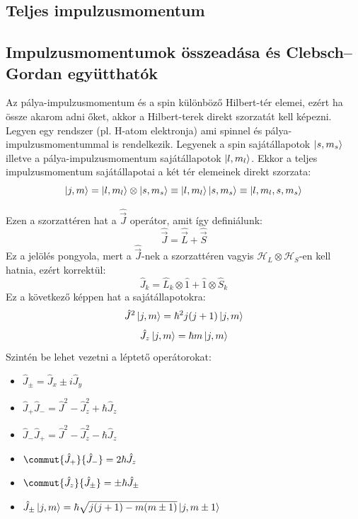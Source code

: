 \subsection{Teljes impulzusmomentum}
\subsection{Impulzusmomentumok összeadása és Clebsch–Gordan együtthatók}
Az pálya-impulzusmomentum és a spin különböző Hilbert-tér elemei, ezért ha össze akarom adni őket,
akkor a Hilbert-terek direkt szorzatát kell képezni.
Legyen egy rendszer (pl. H-atom elektronja) ami spinnel és pálya-impulzusmomentummal is rendelkezik.
Legyenek a spin sajátállapotok $\ket{s, m_s}$ illetve a pálya-impulzusmomentum sajátállapotok $\ket{l, m_l}$.
Ekkor a teljes impulzusmomentum sajátállapotai a két tér elemeinek direkt szorzata:
\begin{equation}
    \ket{j, m} = \ket{l, m_l} \otimes \ket{s, m_s} \equiv \ket{l, m_l}\ket{s, m_s} \equiv \ket{l, m_l,s, m_s}
\end{equation} 

Ezen a szorzattéren hat a $\hat{\vec J}$ operátor, amit így definiálunk:
\begin{equation}
    \hat{\vec J} = \hat{\vec L} + \hat{\vec S}
\end{equation}
Ez a jelölés pongyola, mert a $\hat{\vec J}$-nek a szorzattéren vagyis $\mathcal{H}_L \otimes \mathcal{H}_S$-en kell hatnia,
ezért korrektül:
\begin{equation}
    \hat J_k = \hat L_k \otimes \hat 1 + \hat 1 \otimes \hat S_k
\end{equation}
Ez a következő képpen hat a sajátállapotokra:
\begin{equation}
    \hat J^2 \ket{j, m} = \hbar^2 j(j+1)\ket{j,m}
\end{equation}
\begin{equation}
    \hat J_z \ket{j, m} = \hbar m\ket{j,m}
\end{equation}
Szintén be lehet vezetni a léptető operátorokat:
\begin{itemize}
    \item $
        \hat J_{\pm} = \hat J_x \pm  i \hat J_y
    $
    \item $
       \hat J_+ \hat J_-  = \hat J ^2 - \hat J_z^2 + \hbar \hat J_z
    $
    \item $
       \hat J_- \hat J_+  = \hat J ^2 - \hat J_z^2 - \hbar \hat J_z
    $
    \item $
        \commut{\hat J_+}{\hat J_-} = 2 \hbar \hat J_z
    $
    \item $
        \commut{\hat J_z}{\hat J_{\pm}} = \pm \hbar \hat J_{\pm}
    $
    \item $
        \hat J_{\pm}\ket{j,m} = \hbar \sqrt{j(j+1) - m(m\pm1)}\ket{j,m\pm1}
    $
\end{itemize}
